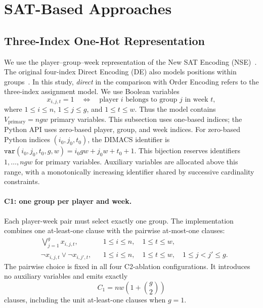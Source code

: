 \documentclass[a4paper,fleqn]{cas-sc}
\begin{document}
\section{SAT-Based Approaches}
\label{sec:sat_approach}

\subsection{Three-Index One-Hot Representation}
\label{sec:sat_model}

We use the player--group--week representation of the New SAT Encoding (NSE)~\cite{kieu2025nse}. The original four-index Direct Encoding (DE) also models positions within groups~\cite{gent2005sat}. In this study, \emph{direct} in the comparison with Order Encoding refers to the three-index assignment model.
We use Boolean variables
\begin{equation}
 x_{i,j,t}=1
 \quad\Longleftrightarrow\quad
 \text{player $i$ belongs to group $j$ in week $t$},
 \label{eq:sgp-direct-variable}
\end{equation}
where $1\leq i\leq n$, $1\leq j\leq g$, and $1\leq t\leq w$.
Thus the model contains $V_{\mathrm{primary}}=ngw$ primary variables.
This subsection uses one-based indices; the Python API uses
zero-based player, group, and week indices. For zero-based Python indices $(i_0,j_0,t_0)$,
the DIMACS identifier is $\texttt{var}(i_0,j_0,t_0,g,w)=i_0 gw+j_0 w+t_0+1$. This bijection reserves identifiers
$1,\ldots,ngw$ for primary variables. Auxiliary variables are allocated
above this range, with a monotonically increasing identifier shared by
successive cardinality constraints.

\paragraph{C1: one group per player and week.}
Each player-week pair must select exactly one group. The implementation
combines one at-least-one clause with the pairwise at-most-one clauses:
\begin{align}
 &\bigvee_{j=1}^{g} x_{i,j,t},
 &&1\leq i\leq n,\quad 1\leq t\leq w,
 \label{eq:sgp-c1-alo}\\
 &\neg x_{i,j,t}\lor\neg x_{i,j',t},
 &&1\leq i\leq n,\quad 1\leq t\leq w,\quad 1\leq j<j'\leq g.
 \label{eq:sgp-c1-amo}
\end{align}
The pairwise choice is fixed in all four C2-ablation configurations. It
introduces no auxiliary variables and emits exactly
\begin{equation}
 C_1=nw\left(1+\binom{g}{2}\right)
 \label{eq:sgp-c1-size}
\end{equation}
clauses, including the unit at-least-one clauses when $g=1$.
\end{document}
